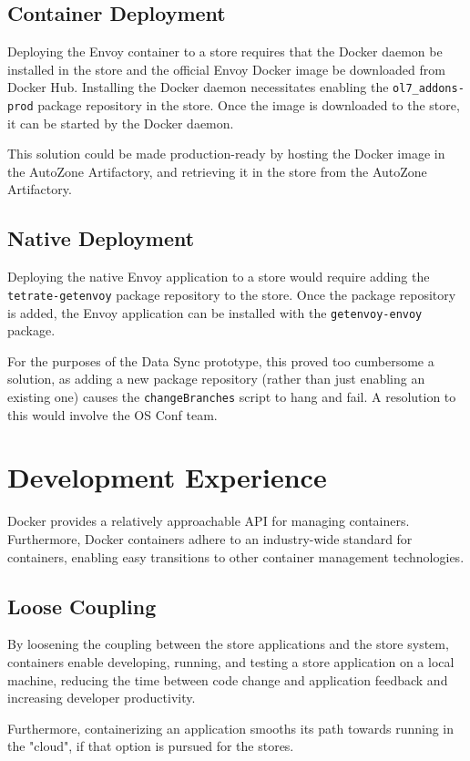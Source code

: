 \documentclass{article}
\begin{document}
\subsection{Container Deployment}
Deploying the Envoy container to a store requires that the Docker daemon be installed in the store and the official Envoy Docker image be downloaded from Docker Hub. Installing the Docker daemon necessitates enabling the \texttt{ol7\_addons-prod} package repository in the store. Once the image is downloaded to the store, it can be started by the Docker daemon.

This solution could be made production-ready by hosting the Docker image in the AutoZone Artifactory, and retrieving it in the store from the AutoZone Artifactory.

\subsection{Native Deployment}
Deploying the native Envoy application to a store would require adding the \texttt{tetrate-getenvoy} package repository to the store. Once the package repository is added, the Envoy application can be installed with the \texttt{getenvoy-envoy} package.

For the purposes of the Data Sync prototype, this proved too cumbersome a solution, as adding a new package repository (rather than just enabling an existing one) causes the \texttt{changeBranches} script to hang and fail. A resolution to this would involve the OS Conf team.

\section{Development Experience}
Docker provides a relatively approachable API for managing containers. Furthermore, Docker containers adhere to an industry-wide standard for containers, enabling easy transitions to other container management technologies.

\subsection{Loose Coupling}
By loosening the coupling between the store applications and the store system, containers enable developing, running, and testing a store application on a local machine, reducing the time between code change and application feedback and increasing developer productivity.

Furthermore, containerizing an application smooths its path towards running in the "cloud", if that option is pursued for the stores.
\end{document}
